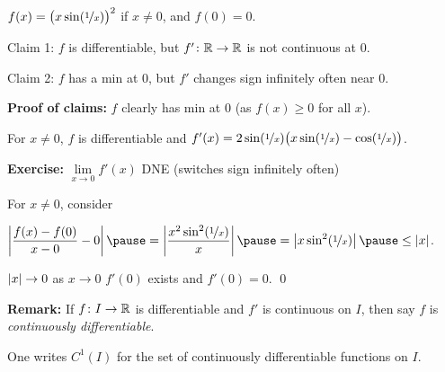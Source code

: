 \documentclass[10pt,aspectratio=149]{beamer}
\begin{document}
\begin{frame}

$f(x) = {\bigl( x \sin(\nicefrac{1}{x}) \bigr)}^2$ if $x \not= 0$, and $f(0) = 0$.

\medskip

Claim 1: $f$ is differentiable, but $f' \colon {\mathbb{R}} \to {\mathbb{R}}$ is not continuous at
$0$.

\medskip

Claim 2: $f$ has a min at $0$, but $f'$
changes sign infinitely often near $0$.

\pause
\medskip

\textbf{Proof of claims:}
$f$ clearly has min at $0$ (as $f(x) \geq 0$ for all $x$).

\pause
\medskip

For $x \not= 0$,
$f$ is differentiable
and
$f'(x) = 2 \sin (\nicefrac{1}{x}) \bigl( x \sin (\nicefrac{1}{x}) -
\cos(\nicefrac{1}{x}) \bigr)$.

\pause
\medskip

\textbf{Exercise:} $\lim\limits_{x\to 0} f'(x)$ DNE (switches sign
infinitely often)

\pause
\medskip

For $x \neq 0$, consider

\medskip

\quad
$\displaystyle
\abs{\frac{f(x)-f(0)}{x-0} - 0}
\pause
=
\abs{\frac{x^2 \sin^2(\nicefrac{1}{x})}{x}}
\pause
=
\abs{x \sin^2(\nicefrac{1}{x})}
\pause
\leq
\abs{x}$.

\pause
\medskip

$\left\lvert {x} \right\rvert \to 0$ as $x \to 0$
\pause
\wthus $f'(0)$ exists and $f'(0) = 0$. \qed

\end{frame}

\begin{frame}

\textbf{Remark:}
If $f \colon I \to {\mathbb{R}}$ is differentiable and
$f'$ is continuous on $I$, then say $f$ is
\emph{continuously differentiable}.

\pause
\medskip

One writes $C^1(I)$ for the set of continuously differentiable functions on $I$.

\end{frame}
\end{document}
